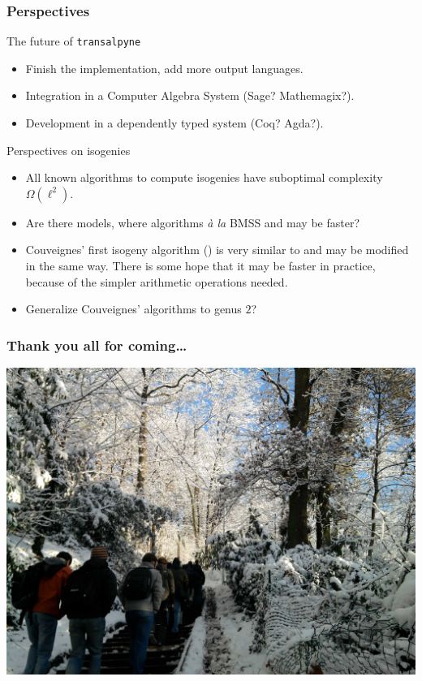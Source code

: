 \documentclass[10pt,usepdftitle=false]{beamer}
\begin{document}
\begin{frame}
  \frametitle{Perspectives}

  \begin{block}{The future of \texttt{transalpyne}}
    \begin{itemize}
    \item Finish the implementation, add more output languages.
    \item Integration in a Computer Algebra System (Sage?
      Mathemagix?).
    \item Development in a dependently typed system (Coq? Agda?).
    \end{itemize}
  \end{block}

  \begin{block}{Perspectives on isogenies}
    \begin{itemize}
    \item All known algorithms to compute isogenies have suboptimal
      complexity $\Omega(\ell^2)$.
    \item Are there models, where algorithms \textit{à la} BMSS and
      \cite{lercier+sirvent08} may be faster?
    \item Couveignes' first isogeny algorithm (\cite{couveignes94}) is
      very similar to \cite{couveignes96} and may be modified in the
      same way. There is some hope that it may be faster in practice,
      because of the simpler arithmetic operations needed.
    \item Generalize Couveignes' algorithms to genus $2$?
    \end{itemize}
  \end{block}
\end{frame}


\setcounter{lastframe}{\theframenumber}

\begin{frame}[plain]
  \frametitle{Thank you all for coming\dots}
  \includegraphics[width=\textwidth]{marcheneige.jpg}
\end{frame}
\end{document}
